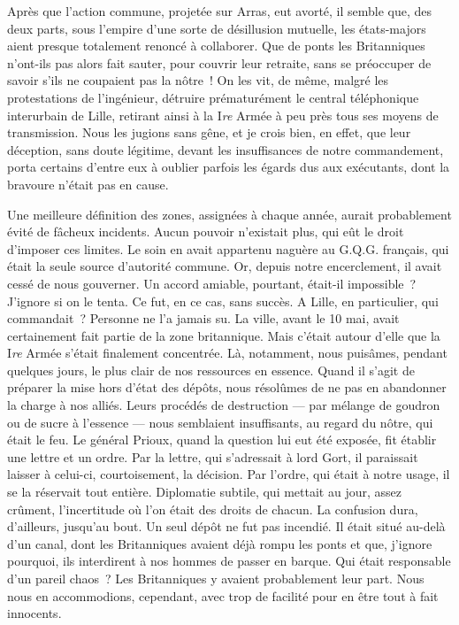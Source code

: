 \documentclass[french,twoside]{book} %
\begin{document}
Après que l’action commune, projetée sur Arras, eut avorté, il semble que, des deux parts, sous l’empire d’une sorte de désillusion mutuelle, les états-majors aient presque totalement renoncé à collaborer. Que de ponts les Britanniques n’ont-ils pas alors fait sauter, pour couvrir leur retraite, sans se préoccuper de savoir s’ils ne coupaient pas la nôtre ! On les vit, de même, malgré les protestations de l’ingénieur, détruire prématurément le central téléphonique interurbain de Lille, retirant ainsi à la I\emph{re} Armée à peu près tous ses moyens de transmission. Nous les jugions sans gêne, et je crois bien, en effet, que leur déception, sans doute légitime, devant les insuffisances de notre commandement, porta certains d’entre eux à oublier parfois les égards dus aux exécutants, dont la bravoure n’était pas en cause.\par
Une meilleure définition des zones, assignées à chaque année, aurait probablement évité de fâcheux incidents. Aucun pouvoir n’existait plus, qui eût le droit d’imposer ces limites. Le soin en avait appartenu naguère au G.Q.G. français, qui était la seule source d’autorité commune. Or, depuis notre encerclement, il avait cessé de nous gouverner. Un accord amiable, pourtant, était-il impossible ? J’ignore si on le tenta. Ce fut, en ce cas, sans succès. A Lille, en particulier, qui commandait ? Personne ne l’a jamais su. La ville, avant le 10 mai, avait certainement fait partie de la zone britannique. Mais c’était autour d’elle que la I\emph{re} Armée s’était finalement concentrée. Là, notamment, nous puisâmes, pendant quelques jours, le plus clair de nos ressources en essence. Quand il s’agit de préparer la mise hors d’état des dépôts, nous résolûmes de ne pas en   abandonner la charge à nos alliés. Leurs procédés de destruction — par mélange de goudron ou de sucre à l’essence — nous semblaient insuffisants, au regard du nôtre, qui était le feu. Le général Prioux, quand la question lui eut été exposée, fit établir une lettre et un ordre. Par la lettre, qui s’adressait à lord Gort, il paraissait laisser à celui-ci, courtoisement, la décision. Par l’ordre, qui était à notre usage, il se la réservait tout entière. Diplomatie subtile, qui mettait au jour, assez crûment, l’incertitude où l’on était des droits de chacun. La confusion dura, d’ailleurs, jusqu’au bout. Un seul dépôt ne fut pas incendié. Il était situé au-delà d’un canal, dont les Britanniques avaient déjà rompu les ponts et que, j’ignore pourquoi, ils interdirent à nos hommes de passer en barque. Qui était responsable d’un pareil chaos ? Les Britanniques y avaient probablement leur part. Nous nous en accommodions, cependant, avec trop de facilité pour en être tout à fait innocents.\par
\end{document}
